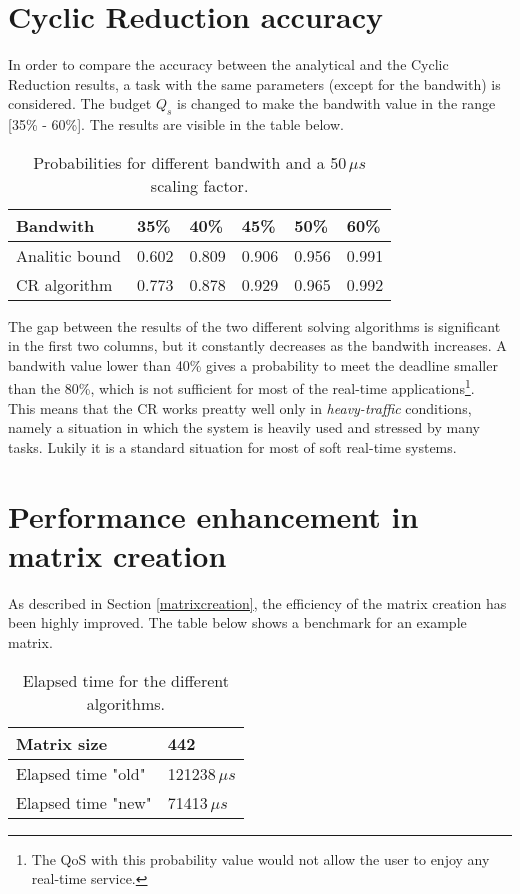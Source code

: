 \section{Cyclic Reduction accuracy} \label{craccuracy}
In order to compare the accuracy between the analytical and the Cyclic Reduction results, a task with the same parameters (except for the bandwith) is considered. The budget \( Q_{s} \) is changed to make the bandwith value in the range [35\% - 60\%]. The results are visible in the table below.
\begin{table}[H]
\label{comparison}
\begin{center}
\begin{tabular}{| l | l | l | l | l | l |}
  \hline
  Bandwith & 35\% & 40\% & 45\% & 50\% & 60\% \\ \hline
  Analitic bound & 0.602 & 0.809 & 0.906 & 0.956 & 0.991 \\
  CR algorithm & 0.773 & 0.878 & 0.929 & 0.965 & 0.992 \\ \hline
\end{tabular}
\caption[]{Probabilities for different bandwith and a 50\,\( \mu{s} \) scaling factor\footnotemark[3].}
\end{center} 
\end{table}

The gap between the results of the two different solving algorithms is significant in the first two columns, but it constantly decreases as the bandwith increases. A bandwith value lower than 40\% gives a probability to meet the deadline smaller than the 80\%, which is not sufficient for most of the real-time applications\footnote{The QoS with this probability value would not allow the user to enjoy any real-time service.}.\\
This means that the CR works preatty well only in \emph{heavy-traffic} conditions, namely a situation in which the system is heavily used and stressed by many tasks. Lukily it is a standard situation for most of soft real-time systems.  

\section{Performance enhancement in matrix creation} \label{matrixperformance}
As described in Section \ref{matrixcreation}, the efficiency of the matrix creation has been highly improved. The table below shows a benchmark for an example matrix.
\begin{table}[H]
\label{benchmark}
\begin{center}
\begin{tabular}{| l | l |}
  \hline
  Matrix size & 442 \\ \hline
  Elapsed time "old" & 121238\( \,\mu{s} \) \\ \hline
  Elapsed time "new" & 71413\( \,\mu{s} \) \\ \hline
\end{tabular}
\caption[]{Elapsed time for the different algorithms\footnotemark.}
\end{center}
\end{table}


